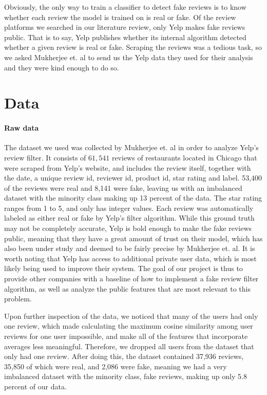\documentclass[man, floatsintext, 10pt]{apa6}
\begin{document}
Obviously, the only way to train a classifier to detect fake reviews is to know whether each review the model is trained on is real or fake. Of the review platforms we  searched in our literature review, only Yelp makes fake reviews public. That is to say, Yelp publishes whether its internal algorithm detected whether a given review is real or fake. Scraping the reviews was a tedious task, so we asked Mukherjee et. al to send us the Yelp data they used for their analysis and they were kind enough to do so. 

\section{Data}

\paragraph{Raw data} The dataset we used was collected by Mukherjee et. al in order to analyze Yelp's review filter. It consists of  $61,541$ reviews of restaurants located in Chicago that were scraped from Yelp's website, and includes the review itself, together with the date, a unique review id, reviewer id, product id, star rating and label. 53,400  of the reviews were real and  8,141 were fake, leaving us with an imbalanced dataset with the minority class making up 13 percent of the data. The star rating ranges from 1 to 5, and only has integer values. Each review was automatically labeled as either real or fake by Yelp's filter algorithm. While this ground truth may not be completely accurate, Yelp is bold enough to make the fake reviews public, meaning that they have a great amount of trust on their model, which has also been under study and deemed to be fairly precise by Mukherjee et. al. It is worth noting that Yelp has access to additional private user data, which is most likely being used to improve their system. The goal of our project is thus to provide other companies with a baseline of how to implement a fake review filter algorithm, as well as analyze the public features that are most relevant to this problem. 

Upon further inspection of the data, we noticed that many of the users had only one review, which made calculating the maximum cosine similarity among user reviews for one user impossible, and make all of the features that incorporate averages less meaningful. Therefore, we dropped all users from the dataset that only had one review. After doing this, the dataset contained 37,936 reviews, 35,850 of which were real, and 2,086 were fake, meaning we had a very imbalanced dataset with the minority class, fake reviews, making up only 5.8 percent of our data. 
\end{document}

